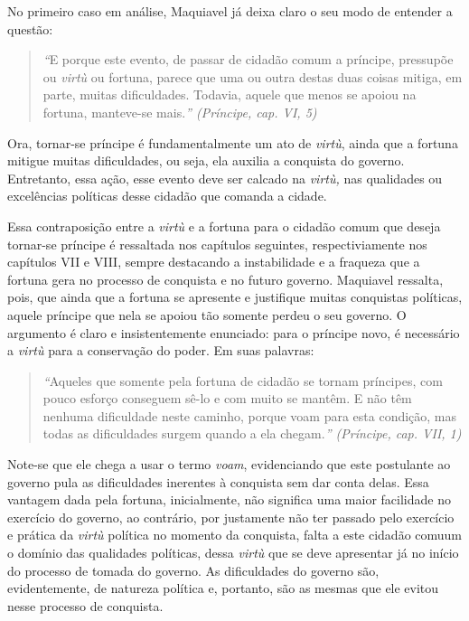 No primeiro caso em análise, Maquiavel já deixa claro o seu modo de
entender a questão:

\begin{quote}
\emph{``}E porque este evento, de passar de cidadão comum a príncipe,
pressupõe ou \emph{virtù} ou fortuna, parece que uma ou outra destas
duas coisas mitiga, em parte, muitas dificuldades. Todavia, aquele que
menos se apoiou na fortuna, manteve-se mais.\emph{'' (Príncipe, cap. VI,
5)}
\end{quote}

Ora, tornar-se príncipe é fundamentalmente um ato de \emph{virtù}, ainda
que a fortuna mitigue muitas dificuldades, ou seja, ela auxilia a
conquista do governo. Entretanto, essa ação, esse evento deve ser
calcado na \emph{virtù,} nas qualidades ou excelências políticas desse
cidadão que comanda a cidade.

Essa contraposição entre a \emph{virtù} e a fortuna para o cidadão comum
que deseja tornar-se príncipe é ressaltada nos capítulos seguintes,
respectiviamente nos capítulos VII e VIII, sempre destacando a
instabilidade e a fraqueza que a fortuna gera no processo de conquista e
no futuro governo. Maquiavel ressalta, pois, que ainda que a fortuna se
apresente e justifique muitas conquistas políticas, aquele príncipe que
nela se apoiou tão somente perdeu o seu governo. O argumento é claro e
insistentemente enunciado: para o príncipe novo, é necessário a
\emph{virtù} para a conservação do poder. Em suas palavras:

\begin{quote}
\emph{``}Aqueles que somente pela fortuna de cidadão se tornam
príncipes, com pouco esforço conseguem sê-lo e com muito se mantêm. E
não têm nenhuma dificuldade neste caminho, porque voam para esta
condição, mas todas as dificuldades surgem quando a ela chegam.\emph{''
(Príncipe, cap. VII, 1)}
\end{quote}

Note-se que ele chega a usar o termo \emph{voam}, evidenciando que este
postulante ao governo pula as dificuldades inerentes à conquista sem dar
conta delas. Essa vantagem dada pela fortuna, inicialmente, não
significa uma maior facilidade no exercício do governo, ao contrário,
por justamente não ter passado pelo exercício e prática da \emph{virtù}
política no momento da conquista, falta a este cidadão comuum o domínio
das qualidades políticas, dessa \emph{virtù} que se deve apresentar já
no início do processo de tomada do governo. As dificuldades do governo
são, evidentemente, de natureza política e, portanto, são as mesmas que
ele evitou nesse processo de conquista.

